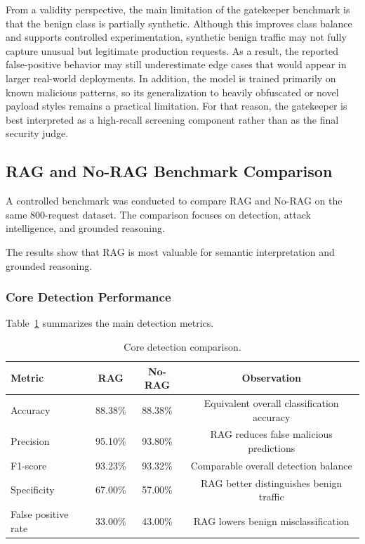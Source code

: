 From a validity perspective, the main limitation of the gatekeeper benchmark is that the benign class is partially synthetic. Although this improves class balance and supports controlled experimentation, synthetic benign traffic may not fully capture unusual but legitimate production requests. As a result, the reported false-positive behavior may still underestimate edge cases that would appear in larger real-world deployments. In addition, the model is trained primarily on known malicious patterns, so its generalization to heavily obfuscated or novel payload styles remains a practical limitation. For that reason, the gatekeeper is best interpreted as a high-recall screening component rather than as the final security judge.


\subsection{RAG and No-RAG Benchmark Comparison}
A controlled benchmark was conducted to compare RAG and No-RAG on the same 800-request dataset. The comparison focuses on detection, attack intelligence, and grounded reasoning.

The results show that RAG is most valuable for semantic interpretation and grounded reasoning.

\subsubsection{Core Detection Performance}
Table~\ref{tab:core-detection-rag-vs-norag} summarizes the main detection metrics.

\begin{table}[H]
    \centering
    \small
    \setlength{\tabcolsep}{5pt}
    \renewcommand{\arraystretch}{1.15}
    \begin{tabularx}{\textwidth}{|X|c|c|c|}
        \hline
        \textbf{Metric} & \textbf{RAG} & \textbf{No-RAG} & \textbf{Observation} \\
        \hline
        Accuracy & 88.38\% & 88.38\% & Equivalent overall classification accuracy \\
        \hline
        Precision & 95.10\% & 93.80\% & RAG reduces false malicious predictions \\
        \hline
        F1-score & 93.23\% & 93.32\% & Comparable overall detection balance \\
        \hline
        Specificity & 67.00\% & 57.00\% & RAG better distinguishes benign traffic \\
        \hline
        False positive rate & 33.00\% & 43.00\% & RAG lowers benign misclassification \\
        \hline
    \end{tabularx}
    \caption{Core detection comparison.}
    \label{tab:core-detection-rag-vs-norag}
\end{table}

